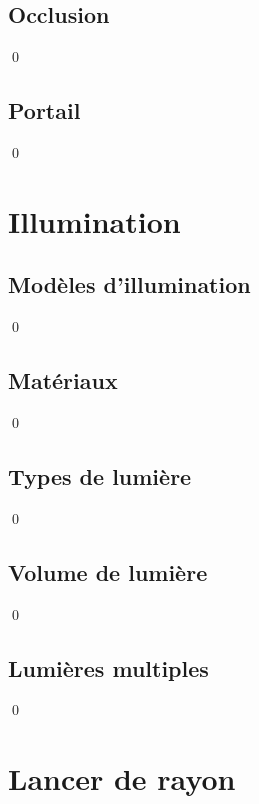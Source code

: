 \documentclass[12pt]{article}
\newcommand{\state}{\noindent}
\begin{document}
\subsection{Occlusion}

\state

\qed

\subsection{Portail}

\state

\qed

\pagebreak


\section{Illumination}

\subsection{Modèles d'illumination}

\state

\qed

\subsection{Matériaux}

\state

\qed

\subsection{Types de lumière}

\state

\qed

\subsection{Volume de lumière}

\state

\qed

\subsection{Lumières multiples}

\state

\qed

\pagebreak

\section{Lancer de rayon}
\end{document}
